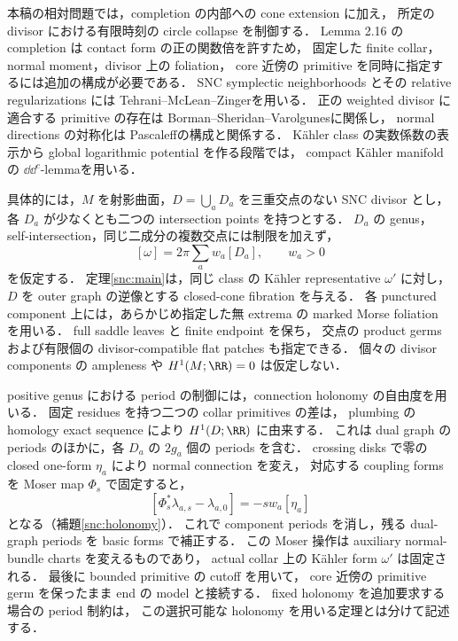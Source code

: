 本稿の相対問題では，completion の内部への cone extension に加え，
所定の divisor における有限時刻の circle collapse を制御する．
Lemma 2.16 の completion は contact form の正の関数倍を許すため，
固定した finite collar，normal moment，divisor 上の foliation，
core 近傍の primitive を同時に指定するには追加の構成が必要である．
SNC symplectic neighborhoods とその relative regularizations には
Tehrani--McLean--Zinger\cite[Definitions 2.11--2.12, Theorem 2.13]{TMZ}を用いる．
正の weighted divisor に適合する primitive の存在は
Borman--Sheridan--Varolgunes\cite[Proposition 2.10]{BSV}に関係し，
normal directions の対称化は Pascaleff\cite[\S4.2]{Pascaleff}の構成と関係する．
Kähler class の実数係数の表示から global logarithmic potential を作る段階では，
compact Kähler manifold の $\dd\dd^c$-lemma\cite[\S5]{DGMS}を用いる．

具体的には，$M$ を射影曲面，$D=\bigcup_aD_a$ を三重交点のない SNC divisor とし，
各 $D_a$ が少なくとも二つの intersection points を持つとする．
$D_a$ の genus，self-intersection，同じ二成分の複数交点には制限を加えず，
\[
 [\omega]=2\pi\sum_a w_a[D_a],\qquad w_a>0
\]
を仮定する．
定理\ref{snc:main}は，同じ class の Kähler representative $\omega'$ に対し，
$D$ を outer graph の逆像とする closed-cone fibration を与える．
各 punctured component 上には，あらかじめ指定した無 extrema の
marked Morse foliation を用いる．
full saddle leaves と finite endpoint を保ち，
交点の product germs および有限個の divisor-compatible flat patches も指定できる．
個々の divisor components の ampleness や $H^1(M;\RR)=0$ は仮定しない．

positive genus における period の制御には，connection holonomy の自由度を用いる．
固定 residues を持つ二つの collar primitives の差は，
plumbing の homology exact sequence により $H^1(D;\RR)$ に由来する．
これは dual graph の periods のほかに，各 $D_a$ の $2g_a$ 個の periods を含む．
crossing disks で零の closed one-form $\eta_a$ により normal connection を変え，
対応する coupling forms を Moser map $\Phi_s$ で固定すると，
\[
 [\Phi_s^*\lambda_{a,s}-\lambda_{a,0}]
       =-s w_a[\eta_a]
\]
となる（補題\ref{snc:holonomy}）．
これで component periods を消し，残る dual-graph periods を basic forms で補正する．
この Moser 操作は auxiliary normal-bundle charts を変えるものであり，
actual collar 上の Kähler form $\omega'$ は固定される．
最後に bounded primitive の cutoff を用いて，
core 近傍の primitive germ を保ったまま end の model と接続する．
fixed holonomy を追加要求する場合の period 制約は，
この選択可能な holonomy を用いる定理とは分けて記述する．


